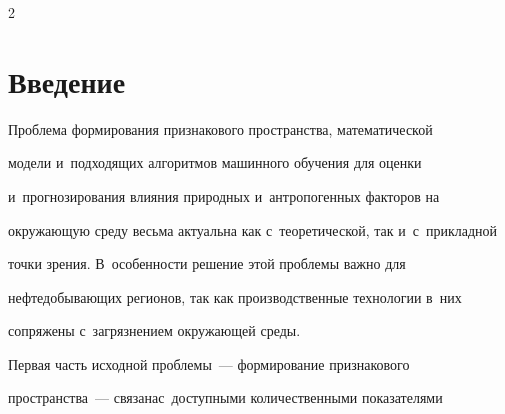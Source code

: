 

  


\vspace*{-3pt}













\thispagestyle{headings}





\begin{multicols}{2}





\label{st\stat}





  


\section{Введение}





\vspace*{-6pt}





  Проблема формирования признакового пространства, математической 


модели и~подходящих алгоритмов машинного обучения для оценки 


и~прогнозирования влияния природных и~антропогенных факторов на 


окружающую среду весьма актуальна как с~теоретической, так и~с~прикладной 


точки зрения. В~особенности решение этой проб\-ле\-мы важно для 


нефтедобывающих регионов, так как производственные технологии в~них 


сопряжены с~загрязнением окружающей среды. 


  


  Первая часть исходной проблемы~--- фор\-ми\-рование признакового 


пространства~--- связана\linebreak с~доступными количественными показателями 



\end{multicols}
